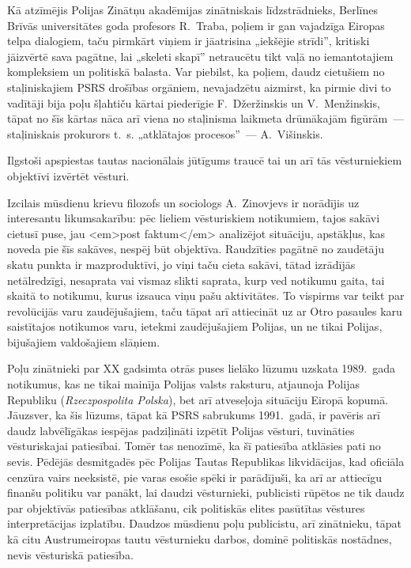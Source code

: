 \documentclass[twoside,a5paper,12pt,fleqn,openany]{extbook}
\newcommand{\pltxti}[1]{\textit{\textpolish{#1}}}
\begin{document}
Kā atzīmējis Polijas Zinātņu akadēmijas zinātniskais līdzstrādnieks, Berlīnes Brīvās universitātes goda profesors R.~Traba, poļiem ir gan vajadzīga Eiropas telpa dialogiem, taču pirmkārt viņiem ir jāatrisina „iekšējie strīdi”, kritiski jāizvērtē sava pagātne, lai „skeleti skapī” netraucētu tikt vaļā no iemantotajiem kompleksiem un politiskā balasta. Var piebilst, ka poļiem, daudz cietušiem no staļiniskajiem PSRS drošības orgāniem, nevajadzētu aizmirst, ka pirmie divi to vadītāji bija poļu šļahtiču kārtai piederīgie F.~Džeržinskis un V.~Menžinskis, tāpat no šīs kārtas nāca arī viena no staļinisma laikmeta drūmākajām figūrām~--- staļiniskais prokurors t.~s. „atklātajos procesos”~--- A.~Višinskis.

Ilgstoši apspiestas tautas nacionālais jūtīgums traucē tai un arī tās vēsturniekiem objektīvi izvērtēt vēsturi.

Izcilais mūsdienu krievu filozofs un sociologs A.~Zinovjevs ir norādījis uz interesantu likumsakarību: pēc lieliem vēsturiskiem notikumiem, tajos sakāvi cietusī puse, jau <em>post faktum</em> analizējot situāciju, apstākļus, kas noveda pie šīs sakāves, nespēj būt objektīva. Raudzīties pagātnē no zaudētāju skatu punkta ir mazproduktīvi, jo viņi taču cieta sakāvi, tātad izrādījās netālredzīgi, nesaprata vai vismaz slikti saprata, kurp ved notikumu gaita, tai skaitā to notikumu, kurus izsauca viņu pašu aktivitātes. To vispirms var teikt par revolūcijās varu zaudējušajiem, taču tāpat arī attiecināt uz ar Otro pasaules karu saistītajos notikumos varu, ietekmi zaudējušajiem Polijas, un ne tikai Polijas, bijušajiem valdošajiem slāņiem.

Poļu zinātnieki par XX gadsimta otrās puses lielāko lūzumu uzskata 1989.~gada notikumus, kas ne tikai mainīja Polijas valsts raksturu, atjaunoja Polijas Republiku (\pltxti{Rzeczpospolita Polska}), bet arī atveseļoja situāciju Eiropā kopumā. Jāuzsver, ka šis lūzums, tāpat kā PSRS sabrukums 1991.~gadā, ir pavēris arī daudz labvēlīgākas iespējas padziļināti izpētīt Polijas vēsturi, tuvināties vēsturiskajai patiesībai. Tomēr tas nenozīmē, ka šī patiesība atklāsies pati no sevis. Pēdējās desmitgadēs pēc Polijas Tautas Republikas likvidācijas, kad oficiāla cenzūra vairs neeksistē, pie varas esošie spēki ir parādījuši, ka arī ar attiecīgu finanšu politiku var panākt, lai daudzi vēsturnieki, publicisti rūpētos ne tik daudz par objektīvās patiesības atklāšanu, cik politiskās elites pasūtītas vēstures interpretācijas izplatību. Daudzos mūsdienu poļu publicistu, arī zinātnieku, tāpat kā citu Austrumeiropas tautu vēsturnieku darbos, dominē politiskās nostādnes, nevis vēsturiskā patiesība.
\end{document}
